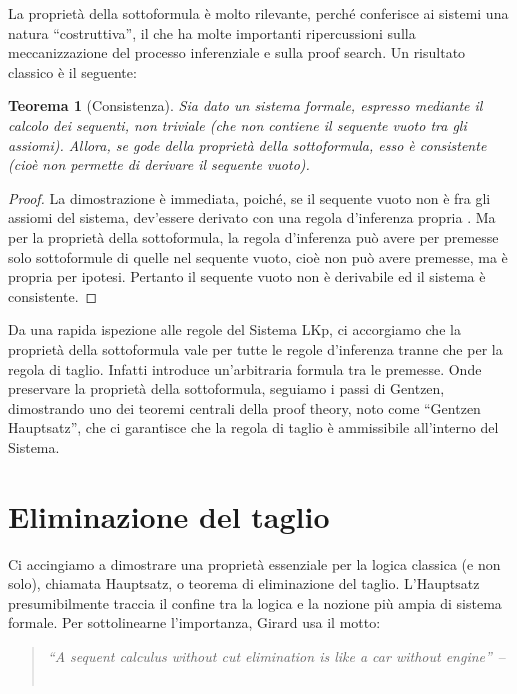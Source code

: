 \documentclass[12pt,a4paper,openright,twoside]{report}
\newtheorem{thm}{Teorema}[section]
\begin{document}
La propriet\`a della sottoformula \`e molto rilevante, perch\'e conferisce ai sistemi una natura ``costruttiva'', il che ha molte importanti ripercussioni sulla meccanizzazione del processo inferenziale e sulla proof search. Un risultato classico \`e il seguente:

\begin{thm}[Consistenza]
Sia dato un sistema formale, espresso mediante il calcolo dei sequenti, non triviale (che non contiene il sequente vuoto tra gli assiomi). Allora, se gode della propriet\`a della sottoformula, esso \`e consistente (cio\`e non permette di derivare il sequente vuoto).
\end{thm}
\begin{proof}
La dimostrazione \`e immediata, poich\'e, se il sequente vuoto non \`e fra gli assiomi del sistema, dev'essere derivato con una regola d'inferenza propria . Ma per la propriet\`a della sottoformula, la regola d'inferenza  pu\`o avere per premesse solo sottoformule di quelle nel sequente vuoto, cio\`e non pu\`o avere premesse, ma  \`e propria per ipotesi. Pertanto il sequente vuoto non \`e derivabile ed il sistema \`e consistente.
\end{proof}

Da una rapida ispezione alle regole del Sistema \textsf{LKp}, ci accorgiamo che la propriet\`a della sottoformula vale per tutte le regole d'inferenza tranne che per la regola di taglio. Infatti  introduce un'arbitraria formula  tra le premesse. Onde preservare la propriet\`a della sottoformula, seguiamo i passi di Gentzen, dimostrando uno dei teoremi centrali della proof theory, noto come ``Gentzen Hauptsatz'', che ci garantisce che la regola di taglio \`e ammissibile all'interno del Sistema.

\section{Eliminazione del taglio}

Ci accingiamo a dimostrare una propriet\`a essenziale per la logica classica (e non solo), chiamata Hauptsatz, o teorema di eliminazione del taglio. L'Hauptsatz presumibilmente traccia il confine tra la logica e la nozione pi\`u ampia di sistema formale. Per sottolinearne l'importanza, Girard usa il motto:
\begin{quote}
	\emph{``A sequent calculus without cut elimination is like a car without engine''}~--~\cite{Gir95}
\end{quote}
\end{document}
